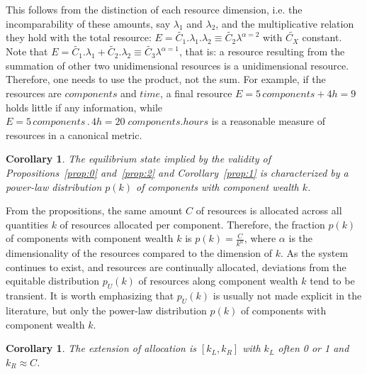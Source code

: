 \documentclass[10pt,letterpaper]{article}
\newtheorem{corollary}[theorem2]{Corollary}
\begin{document}
%

This follows from the distinction of each resource dimension,
i.e. the incomparability of these amounts, say $\lambda_1$ and $\lambda_2$, and the multiplicative relation they hold with the total resource: $E=\widetilde{C_1} . \lambda_1 . \lambda_2 \equiv \widetilde{C_2}\lambda^{\alpha=2}$
with $\widetilde{C_X}$ constant.
Note that $E=\widetilde{C_1} . \lambda_1 + \widetilde{C_2}.\lambda_2 \equiv \widetilde{C_3}\lambda^{\alpha=1}$, that is: a resource resulting from the summation of other two unidimensional resources is a unidimensional resource. Therefore, one needs to use the product, not the sum. For example, if the resources are $components$ and $time$,
a final resource $E=5\, components + 4h=9$
holds little if any information, while
$E= 5\, components \, . \, 4 h= 20\; components . hours$ is
a reasonable measure of resources in a canonical metric.

\begin{corollary}\label{prop:3}
	The equilibrium state implied by the validity of Propositions~\ref{prop:0} and~\ref{prop:2} and Corollary~\ref{prop:1} is characterized by a power-law distribution $p(k)$ of components with component wealth $k$.
\end{corollary}

From the propositions, the same amount $C$ of resources is allocated
across all quantities $k$ of resources allocated per component.
Therefore, the fraction $p(k)$ of components with component wealth $k$ is
$p(k)=\frac{C}{k^\alpha}$, where $\alpha$ is
the dimensionality of the resources compared to the dimension of $k$.
As the system continues to exist,
and resources are continually allocated, deviations from the equitable distribution $p_U(k)$ of resources along component wealth $k$  tend to be transient. It is worth emphasizing that $p_U(k)$ is usually not made explicit in the literature, but only
 the power-law distribution $p(k)$ of components
with component wealth $k$.

\begin{corollary}\label{cor:2}
	The extension of allocation is $[k_L,k_R]$ with $k_L$ often 0 or 1 and $k_R\approx C$.
\end{corollary}
\end{document}
